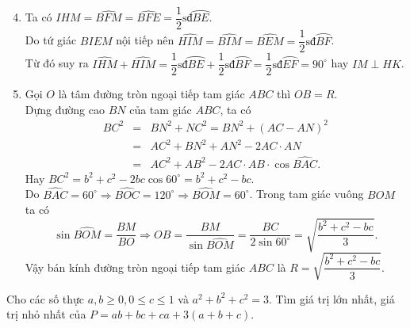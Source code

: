 \begin{ex}
{{
		}
		\begin{enumerate}
			\setcounter{enumi}{3}
			\item[] Ta có $\widehat{IHM}=\widehat{BFM}=\widehat{BFE}=\dfrac{1}{2}\text{sđ}\wideparen{BE}$.\\
		Do tứ giác $BIEM$ nội tiếp nên $\widehat{HIM}=\widehat{BIM}=\widehat{BEM}=\dfrac{1}{2}\text{sđ}\wideparen{BF}$.\\
		Từ đó suy ra $\widehat{IHM}+\widehat{HIM}=\dfrac{1}{2}\text{sđ}\wideparen{BE}+\dfrac{1}{2}\text{sđ}\wideparen{BF}=\dfrac{1}{2}\text{sđ}\wideparen{EF}=90^\circ$ hay $IM\perp HK$.
			\item Gọi $O$ là tâm đường tròn ngoại tiếp tam giác $ABC$ thì $OB=R$.\\
			Dựng đường cao $BN$ của tam giác $ABC$, ta có
			\begin{eqnarray*}
			BC^2 &=& BN^2+NC^2=BN^2+(AC-AN)^2 \\ 
			&=& AC^2+BN^2+AN^2-2AC\cdot AN \\
			&=& AC^2+AB^2-2AC\cdot AB\cdot \cos\widehat{BAC}.
			\end{eqnarray*}
			Hay $BC^2=b^2+c^2-2bc\cos 60^\circ=b^2+c^2-bc$.\\
			Do $\widehat{BAC}=60^\circ\Rightarrow \widehat{BOC}=120^\circ\Rightarrow \widehat{BOM}=60^\circ$. Trong tam giác vuông $BOM$ ta có $$ \sin \widehat{BOM}=\dfrac{BM}{BO}\Rightarrow OB=\dfrac{BM}{\sin \widehat{BOM}}=\dfrac{BC}{2\sin 60^\circ}=\sqrt{\dfrac{b^2+c^2-bc}{3}}. $$
			Vậy bán kính đường tròn ngoại tiếp tam giác $ABC$ là $R=\sqrt{\dfrac{b^2+c^2-bc}{3}}$.
		\end{enumerate}
	}
\end{ex}

\begin{ex}%
	Cho các số thực $a,b\ge 0, 0\le c\le 1$ và $a^2+b^2+c^2=3$. Tìm giá trị lớn nhất, giá trị nhỏ nhất của $P=ab+bc+ca+3(a+b+c)$.
\end{ex}

